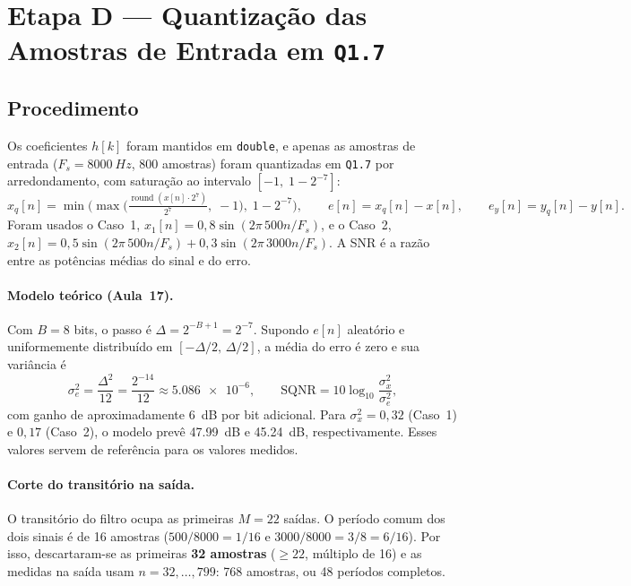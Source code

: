 \documentclass[11pt,a4paper]{article}
\begin{document}
\section{Etapa D — Quantização das Amostras de Entrada em \texttt{Q1.7}}

\subsection{Procedimento}

Os coeficientes $h[k]$ foram mantidos em \texttt{double}, e apenas as amostras de entrada ($F_s = \SI{8000}{Hz}$, 800 amostras) foram quantizadas em \texttt{Q1.7} por arredondamento, com saturação ao intervalo $[-1,\; 1 - 2^{-7}]$:
\begin{equation}
    x_q[n] = \min\!\Big(\max\!\Big(\tfrac{\operatorname{round}(x[n]\cdot 2^7)}{2^7},\; -1\Big),\; 1 - 2^{-7}\Big), \qquad e[n] = x_q[n] - x[n], \qquad e_y[n] = y_q[n] - y[n].
\end{equation}
Foram usados o Caso~1, $x_1[n] = 0,8\sin(2\pi\,500n/F_s)$, e o Caso~2, $x_2[n] = 0,5\sin(2\pi\,500n/F_s) + 0,3\sin(2\pi\,3000n/F_s)$. A SNR é a razão entre as potências médias do sinal e do erro.

\paragraph{Modelo teórico (Aula~17).} Com $B = 8$ bits, o passo é $\Delta = 2^{-B+1} = 2^{-7}$. Supondo $e[n]$ aleatório e uniformemente distribuído em $[-\Delta/2,\, \Delta/2]$, a média do erro é zero e sua variância é
\begin{equation}
    \sigma_e^2 = \frac{\Delta^2}{12} = \frac{2^{-14}}{12} \approx \num{5,086e-6}, \qquad \text{SQNR} = 10\log_{10}\frac{\sigma_x^2}{\sigma_e^2},
\end{equation}
com ganho de aproximadamente \SI{6}{dB} por bit adicional. Para $\sigma_x^2 = 0,32$ (Caso~1) e $0,17$ (Caso~2), o modelo prevê \SI{47,99}{dB} e \SI{45,24}{dB}, respectivamente. Esses valores servem de referência para os valores medidos.

\paragraph{Corte do transitório na saída.} O transitório do filtro ocupa as primeiras $M = 22$ saídas. O período comum dos dois sinais é de 16 amostras ($500/8000 = 1/16$ e $3000/8000 = 3/8 = 6/16$). Por isso, descartaram-se as primeiras \textbf{32 amostras} ($\ge 22$, múltiplo de 16) e as medidas na saída usam $n = 32, \dots, 799$: 768 amostras, ou 48 períodos completos.
\end{document}
